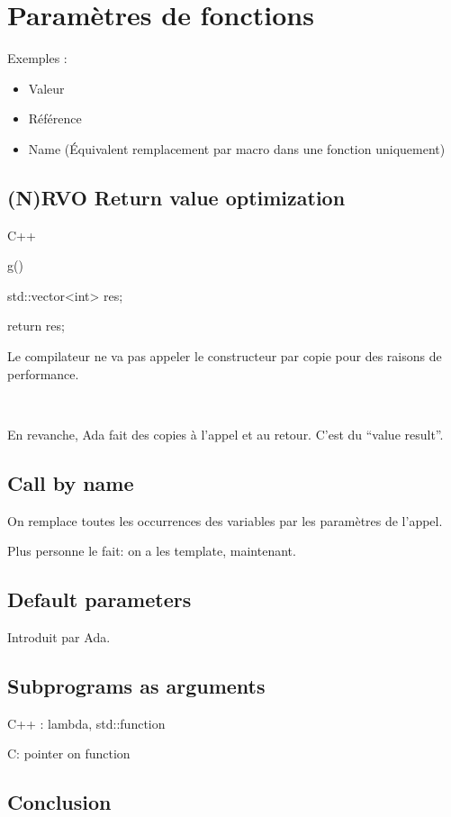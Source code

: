 \documentclass[a4paper,11pt]{article}
\begin{document}
\section{Paramètres de fonctions}
Exemples :
\begin{itemize}
  \item Valeur
  \item Référence
  \item Name (Équivalent remplacement par macro dans une fonction uniquement)
\end{itemize}

\subsection{(N)RVO Return value optimization}

C++

g()

std::vector<int> res;

return res;

Le compilateur ne va pas appeler le constructeur par copie pour des raisons de
performance.

\

En revanche, Ada fait des copies à l'appel et au retour. C'est du ``value
result''.

\subsection{Call by name}

On remplace toutes les occurrences des variables par les paramètres de l'appel.

Plus personne le fait: on a les template, maintenant.

\subsection{Default parameters}

Introduit par Ada.

\subsection{Subprograms as arguments}

C++ : lambda, std::function

C: pointer on function

\subsection{Conclusion}
\end{document}
